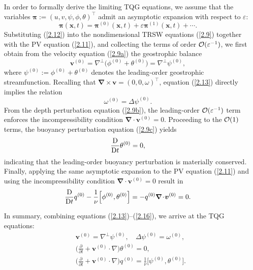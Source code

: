 \documentclass[a4paper,11pt,twoside]{article}
\numberwithin{equation}{section}
\numberwithin{figure}{section}
\numberwithin{table}{section}
\newcommand{\bnabla}{\bm{\nabla}}
\newcommand{\eps}{\varepsilon}
\newcommand{\bx}{\bm{x}}
\newcommand{\bv}{\bm{v}}
\newcommand\eref[1]{(\ref{#1})}
\begin{document}
In order to formally derive the limiting TQG equations, we assume that the variables $\bm\pi:=(u,v,\psi,\phi,\theta)^\top$ admit an
asymptotic expansion with respect to $\eps$:
\begin{equation}
\bm\pi(\bx,t)=\bm\pi^{(0)}(\bx,t)+\eps\bm\pi^{(1)}(\bx,t)+\cdots.
\label{2.12}
\end{equation}
Substituting \eref{2.12} into the nondimensional TRSW equations \eref{2.9} together with the PV equation \eref{2.11}, and collecting the
terms of order ${\cal O}(\eps^{-1})$, we first obtain from the velocity equation \eref{2.9a} the geostrophic balance
\begin{equation}
\bv^{(0)}=\nabla^\perp\big(\phi^{(0)}+\theta^{(0)}\big)=\nabla^\perp\psi^{(0)},
\label{2.13}
\end{equation}
where $\psi^{(0)}:=\phi^{(0)}+\theta^{(0)}$ denotes the leading-order geostrophic streamfunction. Recalling that
$\bnabla\!\times\!\bv=(0,0,\omega)^\top$, equation \eref{2.13} directly implies the relation 
\begin{equation}
\omega^{(0)}=\Delta\psi^{(0)}.
\label{2.14}
\end{equation}
From the depth perturbation equation \eref{2.9b}, the leading-order ${\cal O}(\eps^{-1})$ term enforces the incompressibility condition 
$\bnabla\!\cdot\!\bv^{(0)}=0$. Proceeding to the ${\cal O}(1)$ terms, the buoyancy perturbation equation \eref{2.9c} yields
\begin{equation}
\frac{{\rm D}}{{\rm D}t}\theta^{(0)}=0,
\label{2.15}
\end{equation}
indicating that the leading-order buoyancy perturbation is materially conserved. Finally, applying the same asymptotic expansion to the PV 
equation \eref{2.11} and using the incompressibility condition $\bnabla\!\cdot\!\bv^{(0)}=0$ result in
\begin{equation}
\frac{{\rm D}}{{\rm D}t}q^{(0)}-\frac{1}{\nu}\Big[\phi^{(0)},\theta^{(0)}\Big]=-q^{(0)}\bnabla\!\cdot\!\bv^{(0)}=0.
\label{2.16}
\end{equation}

In summary, combining equations \eref{2.13}--\eref{2.16}, we arrive at the TQG equations:
\begin{subequations}
\begin{align}
&\bv^{(0)}=\nabla^\perp\psi^{(0)},\quad\Delta\psi^{(0)}=\omega^{(0)},\label{2.17a}\\
&\bigg(\frac{\partial}{\partial t}+\bv^{(0)}\cdot\nabla\bigg)\theta^{(0)}=0,\label{2.17b}\\
&\bigg(\frac{\partial}{\partial t}+\bv^{(0)}\cdot\nabla\bigg)q^{(0)}=\frac{1}{\nu}\Big[\psi^{(0)},\theta^{(0)}\Big]\label{2.17c}. 
\end{align}
\label{2.17}
\end{subequations}
\end{document}
